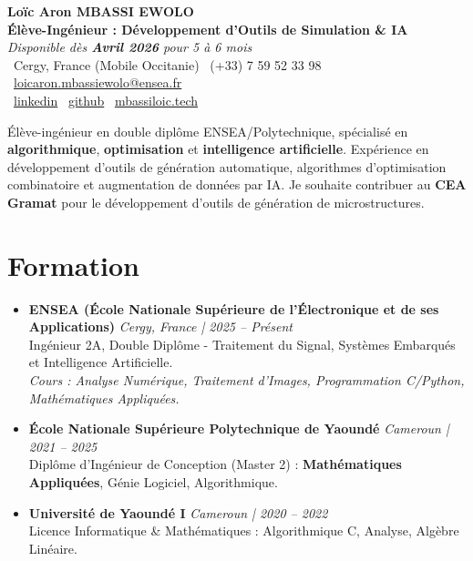 \documentclass[a4paper,11pt]{article}
\begin{document}
\begin{center}
    {\Large \textbf{Loïc Aron MBASSI EWOLO}} \\ \vspace{4pt}
    \textbf{\large Élève-Ingénieur : Développement d'Outils de Simulation \& IA} \\
    \textit{\small Disponible dès \textbf{Avril 2026} pour 5 à 6 mois} \\ \vspace{4pt}
    \small
    \faMapMarker\ Cergy, France (Mobile Occitanie) \quad
    \faPhone\ (+33) 7 59 52 33 98 \quad
    \faEnvelope\ \href{mailto:loicaron.mbassiewolo@ensea.fr}{loicaron.mbassiewolo@ensea.fr} \\ \vspace{2pt}
    \faLinkedin\ \href{https://www.linkedin.com/in/loic-aron-mbassi-ewolo-3942a9246/}{linkedin} \quad
    \faGithub\ \href{https://github.com/Nameless0l}{github} \quad
    \faGlobe\ \href{https://mbassiloic.tech}{mbassiloic.tech}
\end{center}

\vspace{-6pt}

\noindent\small{Élève-ingénieur en double diplôme ENSEA/Polytechnique, spécialisé en \textbf{algorithmique}, \textbf{optimisation} et \textbf{intelligence artificielle}. Expérience en développement d'outils de génération automatique, algorithmes d'optimisation combinatoire et augmentation de données par IA. Je souhaite contribuer au \textbf{CEA Gramat} pour le développement d'outils de génération de microstructures.}

\section{Formation}
\begin{itemize}[leftmargin=*, label={.}, nosep]
    \item \textbf{ENSEA (École Nationale Supérieure de l'Électronique et de ses Applications)} \hfill \textit{Cergy, France | 2025 -- Présent} \\
    \small{Ingénieur 2A, Double Diplôme - Traitement du Signal, Systèmes Embarqués et Intelligence Artificielle.} \\
    \textit{\small{Cours : Analyse Numérique, Traitement d'Images, Programmation C/Python, Mathématiques Appliquées.}}
    \vspace{2pt}
    \item \textbf{École Nationale Supérieure Polytechnique de Yaoundé} \hfill \textit{Cameroun | 2021 -- 2025} \\
    \small{Diplôme d'Ingénieur de Conception (Master 2) : \textbf{Mathématiques Appliquées}, Génie Logiciel, Algorithmique.}
    \item \textbf{Université de Yaoundé I} \hfill \textit{Cameroun | 2020 -- 2022} \\
    \small{Licence Informatique \& Mathématiques : Algorithmique C, Analyse, Algèbre Linéaire.}
\end{itemize}
\end{document}
